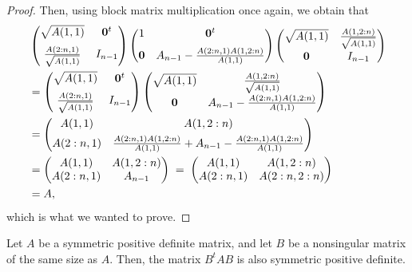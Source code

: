 \begin{proof}
Then, using block matrix multiplication once again, we obtain that
\[
\begin{aligned}
&\begin{pmatrix} \sqrt{A(1,1)} & \mathbf{0}^t \\[0.6em]
\frac{A(2:n,1)}{\sqrt{A(1,1)}} & I_{n-1} \end{pmatrix}
\begin{pmatrix} 1 & \mathbf{0}^t \\[0.6em]
\mathbf{0} & A_{n-1} - \frac{A(2:n,1)A(1,2:n)}{A(1,1)} \end{pmatrix}
\begin{pmatrix} \sqrt{A(1,1)} & \frac{A(1,2:n)}{\sqrt{A(1,1)}} \\[0.6em]
\mathbf{0} & I_{n-1} \end{pmatrix} \\
&= \begin{pmatrix} \sqrt{A(1,1)} & \mathbf{0}^t \\[0.6em]
\frac{A(2:n,1)}{\sqrt{A(1,1)}} & I_{n-1} \end{pmatrix}
\begin{pmatrix} \sqrt{A(1,1)} & \frac{A(1,2:n)}{\sqrt{A(1,1)}} \\[0.6em]
\mathbf{0} & A_{n-1} - \frac{A(2:n,1)A(1,2:n)}{A(1,1)} \end{pmatrix} \\
&= \begin{pmatrix} A(1,1) & A(1,2:n) \\[0.4em]
A(2:n,1) & \frac{A(2:n,1)A(1,2:n)}{A(1,1)} + A_{n-1} -
\frac{A(2:n,1)A(1,2:n)}{A(1,1)} \end{pmatrix} \\
&= \begin{pmatrix} A(1,1) & A(1,2:n) \\ A(2:n,1) & A_{n-1} \end{pmatrix}
\;=\; \begin{pmatrix} A(1,1) & A(1,2:n) \\ A(2:n,1) & A(2:n,2:n) \end{pmatrix} \\
&= A,
\end{aligned}
\]
which is what we wanted to prove.
\end{proof}

\begin{lemma}
Let $A$ be a symmetric positive definite matrix, and let $B$ be a nonsingular
matrix of the same size as $A$. Then, the matrix $B^tAB$ is also symmetric
positive definite.
\end{lemma}

